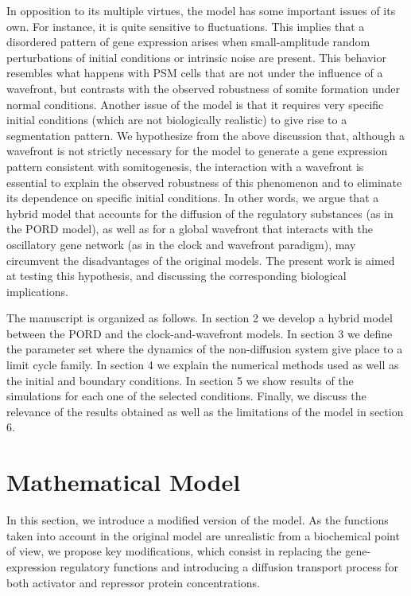\documentclass[%
 preprint,
 amsmath,amssymb,
 aps,
]{revtex4-2}
\begin{document}
	In opposition to its multiple virtues, the \citeauthor{Cotterell2015} model 
	has some important issues of its own. For instance, it is
	quite sensitive to fluctuations. This implies that a disordered pattern of gene
	expression arises when small-amplitude random perturbations of initial conditions 
	or intrinsic noise are present. This behavior resembles what happens with PSM 
	cells that are not under the influence of a wavefront, but contrasts with the 
	observed robustness of somite formation under normal conditions. Another issue 
	of the \citeauthor{Cotterell2015} model is that it requires very specific initial
	conditions (which are not biologically realistic) 
	to give rise to a segmentation pattern. We hypothesize from the
	above discussion that, although a wavefront is not strictly necessary for the
	\citeauthor{Cotterell2015} model to generate a gene expression pattern
	consistent with somitogenesis, the interaction with a wavefront is essential to
	explain the observed robustness of this phenomenon and to eliminate its dependence
	on specific initial conditions. In other words, we argue 
	that a hybrid model that accounts for the diffusion of the regulatory substances
	(as in the PORD model), as well as for a global wavefront that interacts
	with the oscillatory gene network (as in the clock and wavefront paradigm), 
	may circumvent the disadvantages of the original models. The present work is aimed at
	testing this hypothesis, and discussing the corresponding biological
	implications.
	
	The manuscript is organized as follows. In section 2 we develop a hybrid
	model between the PORD and the clock-and-wavefront models. In section 3 we 
	define the parameter set where the dynamics of the non-diffusion system give place 
	to a limit cycle family. In section 4 we explain the numerical methods used as 
	well as the initial and boundary conditions. In section 5 we show results of the
	simulations for each one of the selected conditions. Finally, we discuss the 
	relevance of the results obtained as well as the limitations of the model in 
	section 6.
	
	\section{Mathematical Model}
	\label{model}
	
	In this section, we introduce a modified version of the
	\citeauthor{Cotterell2015} model. As the functions taken into account in the
	original model are unrealistic from a biochemical point of view, we propose key
	modifications, which consist in replacing the gene-expression regulatory
	functions and introducing a diffusion transport process for both activator and
	repressor protein concentrations.
	
\end{document}

